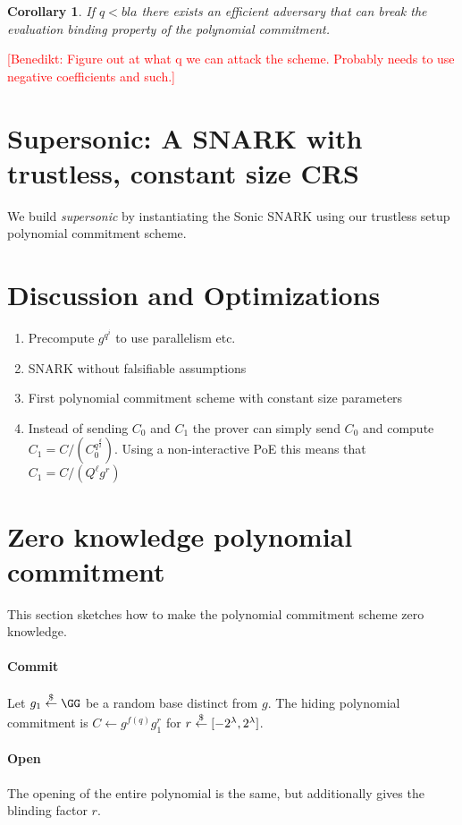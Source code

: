 \documentclass{article}
\newtheorem{corollary}{Corollary}
\newcommand{\benedikt}[1]{{\textcolor{red}{[Benedikt: #1]}}}
\newcommand{\benedikt}[1]{}
\begin{document}
\begin{corollary}
	If $q<bla$ there exists an efficient adversary that can break the evaluation binding property of the polynomial commitment.
\end{corollary}
\benedikt{Figure out at what q we can attack the scheme. Probably needs to use negative coefficients and such.}
\section{Supersonic: A SNARK with trustless, constant size CRS}
We build \emph{supersonic} by instantiating the Sonic SNARK using our trustless setup polynomial commitment scheme.

\section{Discussion and Optimizations}
\begin{enumerate}
	\item Precompute $g^{q^i}$ to use parallelism etc.
	\item SNARK without falsifiable assumptions
	\item First polynomial commitment scheme with constant size parameters
	\item Instead of sending $C_0$ and $C_1$ the prover can simply send $C_0$ and compute $C_1=C/(C_0^{q^{\frac{d}{2}}})$. Using a non-interactive PoE this means that $C_1=C/(Q^{\ell}g^r)$
\end{enumerate}
  

\section{Zero knowledge polynomial commitment} 
This section sketches how to make the polynomial commitment scheme zero knowledge. 

\paragraph{Commit} Let $g_1 \sample \GG$ be a random base distinct from $g$. 
The hiding polynomial commitment is $C \leftarrow g^{f(q)}g_1^r$ for $r \overset{\$}{\gets} [-2^\lambda, 2^\lambda]$. 

\paragraph{Open} The opening of the entire polynomial is the same, but additionally gives the blinding factor $r$. 
\end{document}
